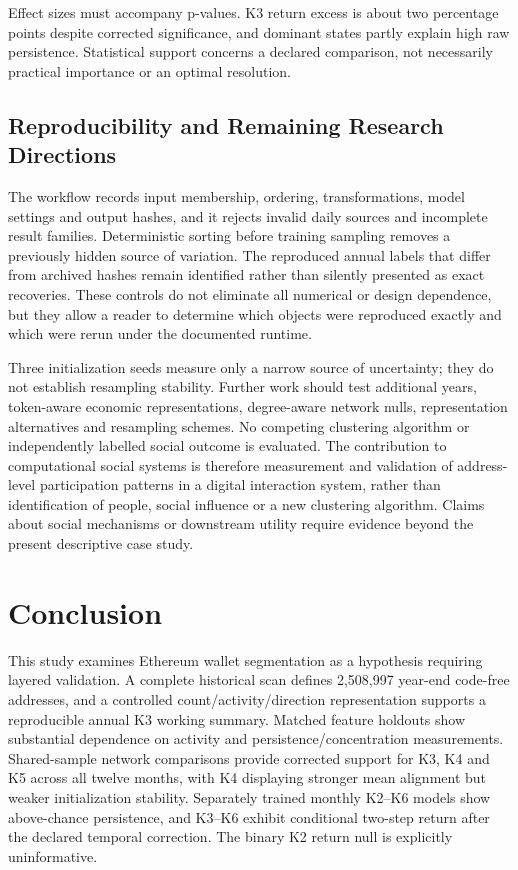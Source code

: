 Effect sizes must accompany p-values. K3 return excess is about two percentage points despite corrected significance, and dominant states partly explain high raw persistence. Statistical support concerns a declared comparison, not necessarily practical importance or an optimal resolution.

\subsection{Reproducibility and Remaining Research Directions}
The workflow records input membership, ordering, transformations, model settings and output hashes, and it rejects invalid daily sources and incomplete result families. Deterministic sorting before training sampling removes a previously hidden source of variation. The reproduced annual labels that differ from archived hashes remain identified rather than silently presented as exact recoveries. These controls do not eliminate all numerical or design dependence, but they allow a reader to determine which objects were reproduced exactly and which were rerun under the documented runtime.

Three initialization seeds measure only a narrow source of uncertainty; they do not establish resampling stability. Further work should test additional years, token-aware economic representations, degree-aware network nulls, representation alternatives and resampling schemes. No competing clustering algorithm or independently labelled social outcome is evaluated. The contribution to computational social systems is therefore measurement and validation of address-level participation patterns in a digital interaction system, rather than identification of people, social influence or a new clustering algorithm. Claims about social mechanisms or downstream utility require evidence beyond the present descriptive case study.

\section{Conclusion}
This study examines Ethereum wallet segmentation as a hypothesis requiring layered validation. A complete historical scan defines 2,508,997 year-end code-free addresses, and a controlled count/activity/direction representation supports a reproducible annual K3 working summary. Matched feature holdouts show substantial dependence on activity and persistence/concentration measurements. Shared-sample network comparisons provide corrected support for K3, K4 and K5 across all twelve months, with K4 displaying stronger mean alignment but weaker initialization stability. Separately trained monthly K2--K6 models show above-chance persistence, and K3--K6 exhibit conditional two-step return after the declared temporal correction. The binary K2 return null is explicitly uninformative.

